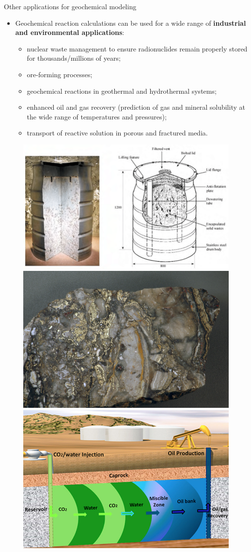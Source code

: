 %
%
\begin{frame}{Other applications for geochemical modeling}
\begin{itemize}
\item Geochemical reaction calculations can be used for a wide range of
\textbf{industrial and environmental applications}: 
\begin{itemize}
\item nuclear waste management to ensure radionuclides remain properly stored
for thousands\slash millions of years;
\item ore-forming processes;
\item geochemical reactions in geothermal and hydrothermal systems;
\item enhanced oil and gas recovery (prediction of gas and mineral solubility 
at the wide range of temperatures and pressures);
\item transport of reactive solution in porous and fractured media.
\end{itemize}
\end{itemize}

\begin{figure}
\centering
\includegraphics[height=0.2\columnwidth]{figures/applications/waste-storage.png} \quad %
\includegraphics[height=0.2\columnwidth]{figures/applications/ore-forming.jpg}  \quad %
\includegraphics[height=0.2\columnwidth]{figures/applications/enhanced-oil-recovery.jpg}%
\end{figure}

\end{frame}

